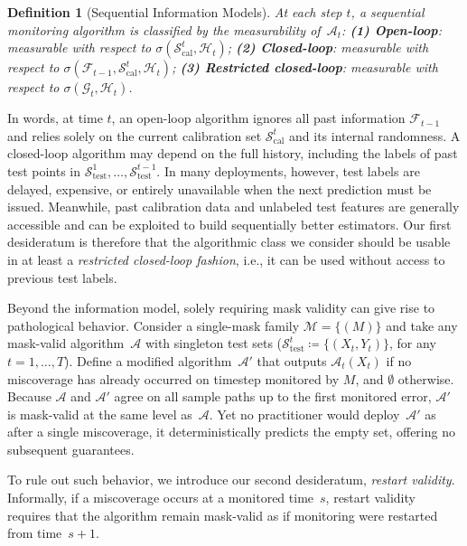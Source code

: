 \documentclass{uai2026} %
\newtheorem{definition}[theorem]{Definition}
\newcommand{\1}{\mathbf{1}}
\newcommand{\test}{\mathrm{test}}
\newcommand{\scal}{\mathcal{S}}
\newcommand{\F}{\mathcal{F}}
\newcommand{\G}{\mathcal{G}}
\newcommand{\mcal}{\mathcal{M}}
\newcommand{\cali}{\mathrm{cal}}
\newcommand{\scalcal}{\scal_{\cali}}
\newcommand{\scaltest}{\scal_{\test}}
\newcommand{\acal}{\mathcal{A}}
\begin{document}
\begin{definition}[Sequential Information Models]
  \label{def:info-models}
  At each step $t$, a sequential monitoring algorithm is classified by the measurability of~$\acal_t$:
  \textbf{(1) Open-loop}: measurable with respect to $\sigma(\scalcal^t, \mathcal{H}_t)$;
  \textbf{(2) Closed-loop}: measurable with respect to $\sigma(\F_{t-1}, \scalcal^t, \mathcal{H}_t)$;
  \textbf{(3) Restricted closed-loop}: measurable with respect to $\sigma(\G_t, \mathcal{H}_t)$.
\end{definition}
In words, at time $t$, an open-loop algorithm ignores all past information $\F_{t-1}$ and relies solely on the current calibration set $\scalcal^t$ and its internal randomness.
A closed-loop algorithm may depend on the full history, including the labels of past test points in $\scaltest^1, \ldots, \scaltest^{t-1}$.
In many deployments, however, test labels are delayed, expensive, or entirely unavailable when the next prediction must be issued. Meanwhile, past calibration data and unlabeled test features are generally accessible and can be exploited to build sequentially better estimators. Our first desideratum is therefore that the algorithmic class we consider should be usable in at least a \textit{restricted closed-loop fashion}, i.e., it can be used without access to previous test labels.

Beyond the information model, solely requiring mask validity can give rise to pathological behavior.
Consider a single-mask family $\mcal = \{(M)\}$ and take any mask-valid algorithm~$\acal$ with singleton test sets ($\scaltest^t \coloneqq \{(X_t, Y_t)\} $, for any ${t=1,\ldots,T}$).
Define a modified algorithm~$\acal'$ that outputs $\acal_t(X_t)$ if no miscoverage has already occurred on timestep monitored by $M$, and $\emptyset$ otherwise.
Because $\acal$ and $\acal'$ agree on all sample paths up to the first monitored error, $\acal'$ is mask-valid at the same level as~$\acal$.
Yet no practitioner would deploy~$\acal'$ as after a single miscoverage, it deterministically predicts the empty set, offering no subsequent guarantees.

To rule out such behavior, we introduce our second desideratum, \emph{restart validity}. Informally, if a miscoverage occurs at a monitored time~$s$, restart validity requires that the algorithm remain mask-valid as if monitoring were restarted from time~$s+1$.
\end{document}
